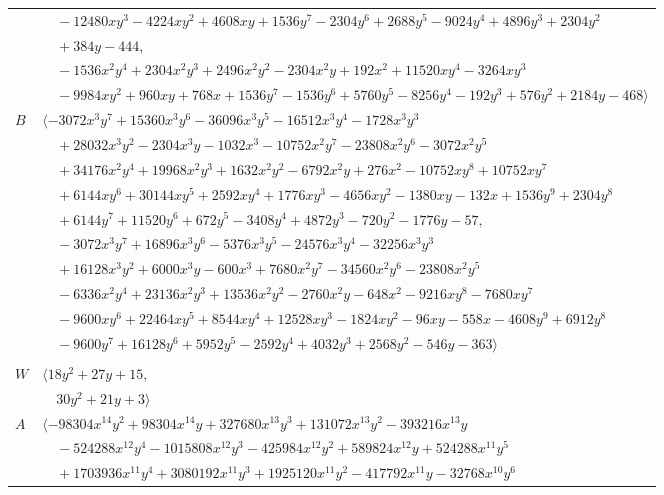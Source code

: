 \documentclass[11pt]{article}
\begin{document}
\begin{longtable}{@{}ll@{}}
 & $\quad -12480xy^{3}-4224xy^{2}+4608xy+1536y^{7}-2304y^{6}+2688y^{5}-9024y^{4}+4896y^{3}+2304y^{2}$\\
 & $\quad +384y-444,$\\
 & $\quad -1536x^{2}y^{4}+2304x^{2}y^{3}+2496x^{2}y^{2}-2304x^{2}y+192x^{2}+11520xy^{4}-3264xy^{3}$\\
 & $\quad -9984xy^{2}+960xy+768x+1536y^{7}-1536y^{6}+5760y^{5}-8256y^{4}-192y^{3}+576y^{2}+2184y-468\rangle$\\
$B$ & $\langle -3072x^{3}y^{7}+15360x^{3}y^{6}-36096x^{3}y^{5}-16512x^{3}y^{4}-1728x^{3}y^{3}$\\
 & $\quad +28032x^{3}y^{2}-2304x^{3}y-1032x^{3}-10752x^{2}y^{7}-23808x^{2}y^{6}-3072x^{2}y^{5}$\\
 & $\quad +34176x^{2}y^{4}+19968x^{2}y^{3}+1632x^{2}y^{2}-6792x^{2}y+276x^{2}-10752xy^{8}+10752xy^{7}$\\
 & $\quad +6144xy^{6}+30144xy^{5}+2592xy^{4}+1776xy^{3}-4656xy^{2}-1380xy-132x+1536y^{9}+2304y^{8}$\\
 & $\quad +6144y^{7}+11520y^{6}+672y^{5}-3408y^{4}+4872y^{3}-720y^{2}-1776y-57,$\\
 & $\quad -3072x^{3}y^{7}+16896x^{3}y^{6}-5376x^{3}y^{5}-24576x^{3}y^{4}-32256x^{3}y^{3}$\\
 & $\quad +16128x^{3}y^{2}+6000x^{3}y-600x^{3}+7680x^{2}y^{7}-34560x^{2}y^{6}-23808x^{2}y^{5}$\\
 & $\quad -6336x^{2}y^{4}+23136x^{2}y^{3}+13536x^{2}y^{2}-2760x^{2}y-648x^{2}-9216xy^{8}-7680xy^{7}$\\
 & $\quad -9600xy^{6}+22464xy^{5}+8544xy^{4}+12528xy^{3}-1824xy^{2}-96xy-558x-4608y^{9}+6912y^{8}$\\
 & $\quad -9600y^{7}+16128y^{6}+5952y^{5}-2592y^{4}+4032y^{3}+2568y^{2}-546y-363\rangle$\\
\addlinespace[2pt]
\multicolumn{2}{@{}p{0.97\textwidth}@{}}{$i=46$, $D_i=16$, $\rho_{ij}$: $0{:}1, \allowbreak 1{:}1, \allowbreak 3{:}2, \allowbreak 12{:}2, \allowbreak 14{:}2, \allowbreak 33{:}2, \allowbreak 36{:}2, \allowbreak 38{:}2, \allowbreak 39{:}2$}\\
$W$ & $\langle 18y^{2}+27y+15,$\\
 & $\quad 30y^{2}+21y+3\rangle$\\
$A$ & $\langle -98304x^{14}y^{2}+98304x^{14}y+327680x^{13}y^{3}+131072x^{13}y^{2}-393216x^{13}y$\\
 & $\quad -524288x^{12}y^{4}-1015808x^{12}y^{3}-425984x^{12}y^{2}+589824x^{12}y+524288x^{11}y^{5}$\\
 & $\quad +1703936x^{11}y^{4}+3080192x^{11}y^{3}+1925120x^{11}y^{2}-417792x^{11}y-32768x^{10}y^{6}$\\

\end{longtable}
\end{document}
